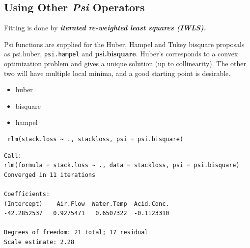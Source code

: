 \documentclass[12pt, a4paper]{article}
\theoremstyle{plain}
\theoremstyle{definition}
\theoremstyle{remark}
\begin{document}
\subsection{Using Other \textit{Psi} Operators}

Fitting is done by \textbf{\emph{iterated re-weighted least squares (IWLS).}}

Psi functions are supplied for the Huber, Hampel and Tukey bisquare proposals as psi.huber, \texttt{psi.hampel} and \textbf{psi.bisquare}. Huber's corresponds to a convex optimization problem and gives a unique solution (up to collinearity). The other two will have multiple local minima, and a good starting point is desirable.



\begin{itemize}
\item huber
\item bisquare
\item hampel

\end{itemize}

\begin{framed}
\begin{verbatim}
 rlm(stack.loss ~ ., stackloss, psi = psi.bisquare)
\end{verbatim}
\end{framed}
\begin{verbatim}
Call:
rlm(formula = stack.loss ~ ., data = stackloss, psi = psi.bisquare)
Converged in 11 iterations

Coefficients:
(Intercept)    Air.Flow  Water.Temp  Acid.Conc. 
-42.2852537   0.9275471   0.6507322  -0.1123310 

Degrees of freedom: 21 total; 17 residual
Scale estimate: 2.28 
\end{verbatim}
\end{document}
